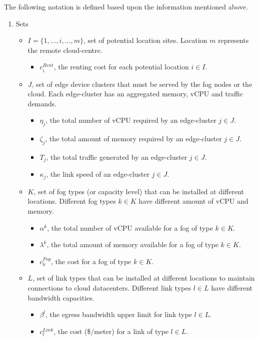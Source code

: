 \documentclass[10pt,journal,compsoc]{IEEEtran}
\begin{document}
The following notation is defined based upon the information mentioned above.

\begin{enumerate}
\item Sets
\begin{itemize}
\item $ \textit{I} = \{ 1,...,i,...,m \}$, set of potential location sites. Location $m$ represents the remote cloud-centre.
\begin{itemize}
\item $c_i^{Rent}$, the renting cost for each potential location $i \in I$.
\end{itemize}
\item $\textit{J}$, set of edge device clusters that must be served by the fog nodes or the cloud. Each edge-cluster has an aggregated memory, vCPU and traffic demands.
\begin{itemize}
\item $\eta_j$, the total number of vCPU required by an edge-cluster $j \in J$.
\item $\zeta_j$, the total amount of memory required by an edge-cluster $j \in J$.
\item $T_j$, the total traffic generated by an edge-cluster $j \in J$.
\item $\kappa_j$, the link speed of an edge-cluster $j \in J$.
\end{itemize}

\item $K$, set of fog types (or capacity level) that can be installed at different locations. Different fog types $k \in K$ have different amount of vCPU and memory.
\begin{itemize}
\item $\alpha^k$, the total number of vCPU available for a fog of type $k \in K$.
\item $\lambda^k$, the total amount of memory available for a fog of type $k \in K$.
\item $c_k^{Fog}$, the cost for a fog of type $k \in K$.
\end{itemize} 
\item $L$, set of link types that can be installed at different locations to maintain connections to cloud datacenters. Different link types $l \in L$ have different bandwidth capacities. 
\begin{itemize}
\item $\beta^l$, the egress bandwidth upper limit for link type $l \in L$.
\item $c_l^{Link}$, the cost (\$/meter) for a link of type $l \in L$.
\end{itemize}
\end{itemize}



\end{enumerate}
\end{document}
